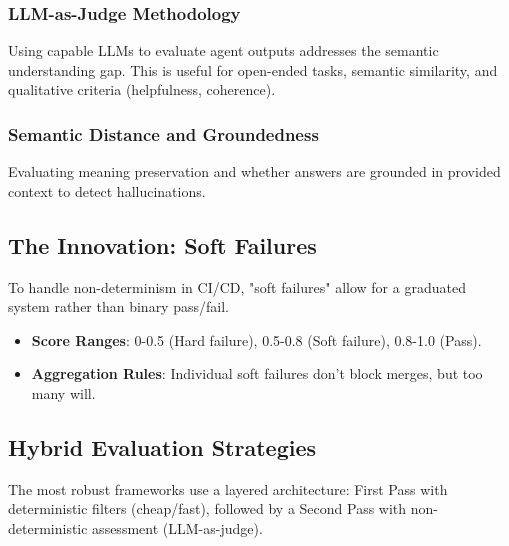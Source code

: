 \begin{TNtwocol}
\subsubsection{LLM-as-Judge Methodology}
Using capable LLMs to evaluate agent outputs addresses the semantic understanding gap. This is useful for open-ended tasks, semantic similarity, and qualitative criteria (helpfulness, coherence).
\subsubsection{Semantic Distance and Groundedness}
Evaluating meaning preservation and whether answers are grounded in provided context to detect hallucinations.

\subsection{The Innovation: Soft Failures}
To handle non-determinism in CI/CD, "soft failures" allow for a graduated system rather than binary pass/fail.
\begin{itemize}
    \item \textbf{Score Ranges}: 0-0.5 (Hard failure), 0.5-0.8 (Soft failure), 0.8-1.0 (Pass).
    \item \textbf{Aggregation Rules}: Individual soft failures don't block merges, but too many will.
\end{itemize}

\subsection{Hybrid Evaluation Strategies}
The most robust frameworks use a layered architecture: First Pass with deterministic filters (cheap/fast), followed by a Second Pass with non-deterministic assessment (LLM-as-judge).
\end{TNtwocol}
